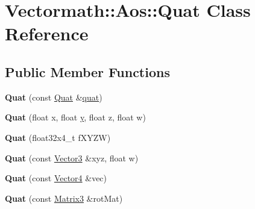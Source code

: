 \hypertarget{class_vectormath_1_1_aos_1_1_quat}{\section{Vectormath\+:\+:Aos\+:\+:Quat Class Reference}
\label{class_vectormath_1_1_aos_1_1_quat}
}
\subsection*{Public Member Functions}
\begin{DoxyCompactItemize}
\item 
\hypertarget{class_vectormath_1_1_aos_1_1_quat_a102854a15448f2159ad8ed45e2573275}{{\bfseries Quat} (const \hyperlink{class_vectormath_1_1_aos_1_1_quat}{Quat} \&\hyperlink{classquat}{quat})}\label{class_vectormath_1_1_aos_1_1_quat_a102854a15448f2159ad8ed45e2573275}

\item 
\hypertarget{class_vectormath_1_1_aos_1_1_quat_affbeca410d11cee6e77ea27c610ab386}{{\bfseries Quat} (float x, float \hyperlink{_ice_utils_8h_aa7ffaed69623192258fb8679569ff9ba}{y}, float z, float w)}\label{class_vectormath_1_1_aos_1_1_quat_affbeca410d11cee6e77ea27c610ab386}

\item 
\hypertarget{class_vectormath_1_1_aos_1_1_quat_aa547779cc63b69ef0c1444032929273d}{{\bfseries Quat} (float32x4\+\_\+t f\+X\+Y\+Z\+W)}\label{class_vectormath_1_1_aos_1_1_quat_aa547779cc63b69ef0c1444032929273d}

\item 
\hypertarget{class_vectormath_1_1_aos_1_1_quat_a8af91b1419e8548fc2d987fc662dce64}{{\bfseries Quat} (const \hyperlink{class_vectormath_1_1_aos_1_1_vector3}{Vector3} \&xyz, float w)}\label{class_vectormath_1_1_aos_1_1_quat_a8af91b1419e8548fc2d987fc662dce64}

\item 
\hypertarget{class_vectormath_1_1_aos_1_1_quat_a60356545117438d21499d0afd7d689da}{{\bfseries Quat} (const \hyperlink{class_vectormath_1_1_aos_1_1_vector4}{Vector4} \&vec)}\label{class_vectormath_1_1_aos_1_1_quat_a60356545117438d21499d0afd7d689da}

\item 
\hypertarget{class_vectormath_1_1_aos_1_1_quat_a6ee788faa20607fe4c9823ef2065c689}{{\bfseries Quat} (const \hyperlink{class_vectormath_1_1_aos_1_1_matrix3}{Matrix3} \&rot\+Mat)}\label{class_vectormath_1_1_aos_1_1_quat_a6ee788faa20607fe4c9823ef2065c689}


\end{DoxyCompactItemize}
